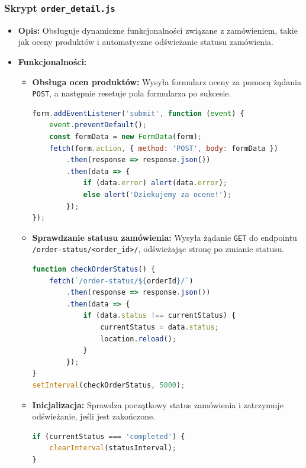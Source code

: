 \documentclass[12pt,a4paper,oneside]{article}
\theoremstyle{definition}
\numberwithin{equation}{section}
\begin{document}
\subsubsection{Skrypt \texttt{order\_detail.js}}
\begin{itemize}
    \item \textbf{Opis:} 
    Obsługuje dynamiczne funkcjonalności związane z zamówieniem, takie jak oceny produktów i automatyczne odświeżanie statusu zamówienia.
    \item \textbf{Funkcjonalności:}
    \begin{itemize}
        \item \textbf{Obsługa ocen produktów:}
        Wysyła formularz oceny za pomocą żądania \texttt{POST}, a następnie resetuje pola formularza po sukcesie.
        \begin{lstlisting}[language=JavaScript]
form.addEventListener('submit', function (event) {
    event.preventDefault();
    const formData = new FormData(form);
    fetch(form.action, { method: 'POST', body: formData })
        .then(response => response.json())
        .then(data => {
            if (data.error) alert(data.error);
            else alert('Dziekujemy za ocene!');
        });
});
        \end{lstlisting}
        \item \textbf{Sprawdzanie statusu zamówienia:}
        Wysyła żądanie \texttt{GET} do endpointu \texttt{/order-status/<order\_id>/}, odświeżając stronę po zmianie statusu.
        \begin{lstlisting}[language=JavaScript]
function checkOrderStatus() {
    fetch(`/order-status/${orderId}/`)
        .then(response => response.json())
        .then(data => {
            if (data.status !== currentStatus) {
                currentStatus = data.status;
                location.reload();
            }
        });
}
setInterval(checkOrderStatus, 5000);
        \end{lstlisting}
        \item \textbf{Inicjalizacja:} Sprawdza początkowy status zamówienia i zatrzymuje odświeżanie, jeśli jest zakończone.
        \begin{lstlisting}[language=JavaScript]
if (currentStatus === 'completed') {
    clearInterval(statusInterval);
}
        \end{lstlisting}
    \end{itemize}
\end{itemize}


% 
% 
\end{document}
